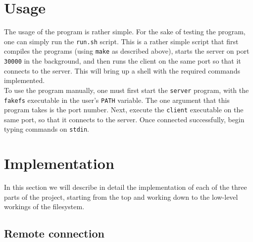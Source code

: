 \documentclass[twoside]{article}
\begin{document}
\begin{multicols}{2}

\section{Usage}

The usage of the program is rather simple. For the sake of testing the program,
one can simply run the \texttt{run.sh} script. This is a rather simple script
that first compiles the programs (using \texttt{make} as described above),
starts the server on port \texttt{30000} in the background, and then runs the
client on the same port so that it connects to the server. This will bring up a
shell with the required commands implemented.
\\
To use the program manually, one must first start the \texttt{server} program,
with the \texttt{fakefs} executable in the user's \texttt{PATH} variable. The
one argument that this program takes is the port number.  Next, execute the
\texttt{client} executable on the same port, so that it connects to the server.
Once connected successfully, begin typing commands on \texttt{stdin}.


\section{Implementation}

In this section we will describe in detail the implementation of each of the
three parts of the project, starting from the top and working down to the
low-level workings of the filesystem.

\subsection{Remote connection}


\end{multicols}
\end{document}

